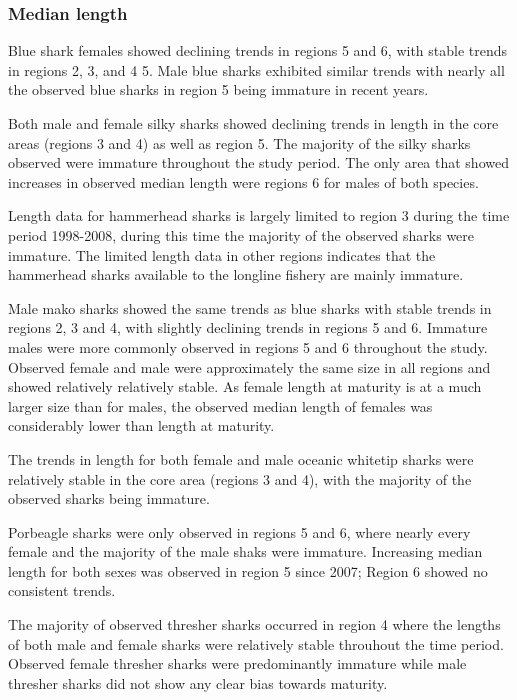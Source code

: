 \documentclass[12pt]{SCreport}
\begin{document}
\subsubsection{Median length}
Blue shark females showed declining trends in regions 5 and 6, with stable trends in regions 2, 3, and 4 5. Male blue sharks exhibited similar trends with nearly all the observed blue sharks in region 5 being immature in recent years. 

Both male and female silky sharks showed declining trends in length in the core areas (regions 3 and 4) as well as region 5.  The majority of the silky sharks observed were immature throughout the study period. The only area  that showed increases in observed median length were regions 6 for males of both species. 

Length data for hammerhead sharks is largely limited to region 3 during the time period 1998-2008, during this time the majority of the observed sharks were immature. The limited length data in other regions indicates that the hammerhead sharks available to the longline fishery are mainly immature.

Male mako sharks showed the same trends as blue sharks with stable trends in regions 2, 3 and 4, with slightly declining trends in regions 5 and 6. Immature males were more commonly observed in regions 5 and 6 throughout the study.  Observed female and male were approximately the same size in all regions and showed relatively relatively stable.  As female length at maturity is at a much larger size than for males, the observed median length of females was considerably lower than  length at maturity.

The trends in length for both female and male oceanic whitetip sharks were relatively stable in the core area (regions 3 and 4),  with the majority of the observed sharks being immature.  

Porbeagle sharks were only observed in regions 5 and 6, where nearly every female and the majority of the male shaks were immature.  Increasing median length for both sexes was observed in region 5 since 2007; Region 6 showed no consistent trends.

The majority of observed thresher sharks occurred in region 4 where the lengths of both male and female sharks were relatively stable throuhout the time period. Observed female thresher sharks were predominantly immature while male thresher sharks did not show any clear bias towards maturity.
\end{document}
